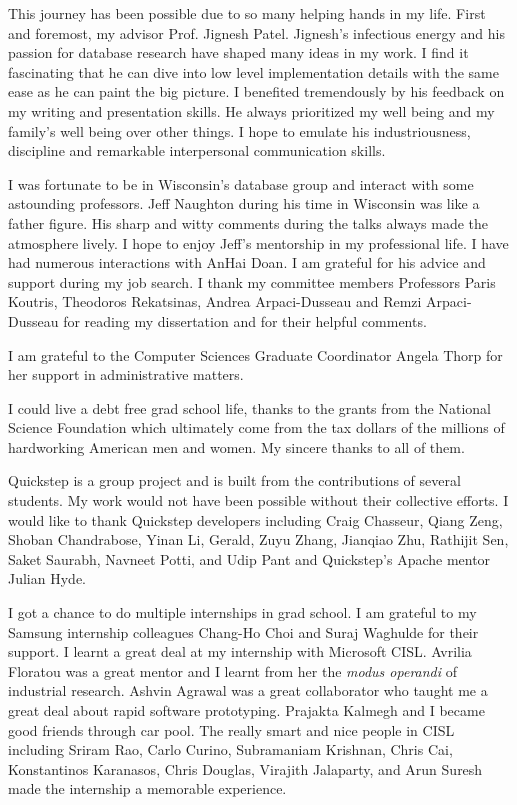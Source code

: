 This journey has been possible due to so many helping hands in my life. 
First and foremost, my advisor Prof. Jignesh Patel. 
Jignesh's infectious energy and his passion for database research have shaped many ideas in my work.
I find it fascinating that he can dive into low level implementation details with the same ease as he can paint the big picture.
I benefited tremendously by his feedback on my writing and presentation skills. 
He always prioritized my well being and my family's well being over other things. 
I hope to emulate his industriousness, discipline and remarkable interpersonal communication skills. 

I was fortunate to be in Wisconsin's database group and interact with some astounding professors. 
Jeff Naughton during his time in Wisconsin was like a father figure. 
His sharp and witty comments during the talks always made the atmosphere lively. 
I hope to enjoy Jeff's mentorship in my professional life. 
I have had numerous interactions with AnHai Doan.
I am grateful for his advice and support during my job search.
I thank my committee members Professors Paris Koutris, Theodoros Rekatsinas, Andrea Arpaci-Dusseau and Remzi Arpaci-Dusseau for reading my dissertation and for their helpful comments. 

I am grateful to the Computer Sciences Graduate Coordinator Angela Thorp for her support in administrative matters. 

I could live a debt free grad school life, thanks to the grants from the National Science Foundation which  ultimately come from the tax dollars of the millions of hardworking American men and women. 
My sincere thanks to all of them.

Quickstep is a group project and is built from the contributions of several students.
My work would not have been possible without their collective efforts. 
I would like to thank Quickstep developers including Craig Chasseur, Qiang Zeng, Shoban Chandrabose, Yinan Li, Gerald, Zuyu Zhang, Jianqiao Zhu, Rathijit Sen, Saket Saurabh, Navneet Potti, and Udip Pant and Quickstep's Apache mentor Julian Hyde.  

I got a chance to do multiple internships in grad school. 
I am grateful to my Samsung internship colleagues Chang-Ho Choi and Suraj Waghulde for their support. 
I learnt a great deal at my internship with Microsoft CISL.
Avrilia Floratou was a great mentor and I learnt from her the \textit{modus operandi} of industrial research.
Ashvin Agrawal was a great collaborator who taught me a great deal about rapid software prototyping. 
Prajakta Kalmegh and I became good friends through car pool. 
The really smart and nice people in CISL including Sriram Rao, Carlo Curino, Subramaniam Krishnan, Chris Cai, Konstantinos Karanasos, Chris Douglas, Virajith Jalaparty, and Arun Suresh made the internship a memorable experience. 

